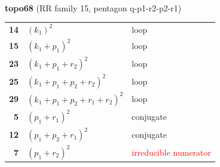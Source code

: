 \documentclass[10pt]{article}
\begin{document}
\begin{minipage}[t]{0.48\textwidth}
{}\\[2mm]\textbf{topo68} (RR family 15, pentagon q-p1-r2-p2-r1)\\[2pt]{\footnotesize\begin{tabular}{@{}r@{\ \ }l@{\ \ }l@{}}\textbf{14} & $(k_1)^2$ & loop\\
\textbf{15} & $(k_1+p_1)^2$ & loop\\
\textbf{23} & $(k_1+p_1+r_2)^2$ & loop\\
\textbf{25} & $(k_1+p_1+p_2+r_2)^2$ & loop\\
\textbf{29} & $(k_1+p_1+p_2+r_1+r_2)^2$ & loop\\
\textbf{5} & $(p_1+r_1)^2$ & conjugate\\
\textbf{12} & $(p_1+p_2+r_1)^2$ & conjugate\\
\textbf{7} & $(p_1+r_2)^2$ & \textcolor{red}{irreducible numerator}\\\end{tabular}}\end{minipage}

\bigskip
\end{document}
